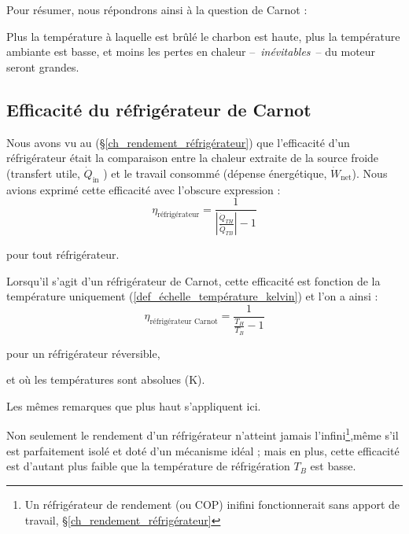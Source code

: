 		Pour résumer, nous répondrons ainsi à la question de Carnot :

		Plus la température à laquelle est brûlé le charbon est haute, plus la température ambiante est basse, et moins les pertes en chaleur --\ \emph{inévitables}\ -- du moteur seront grandes.

		 

	\subsection{Efficacité du réfrigérateur de Carnot}

		Nous avons vu au (\S\ref{ch_rendement_réfrigérateur})	que l’efficacité d’un réfrigérateur était la comparaison entre la chaleur extraite de la source froide (transfert utile, $\dot{Q}_\text{in}$ ) et le travail consommé (dépense énergétique, $\dot{W}_\text{net}$).  Nous avions exprimé cette efficacité avec l’obscure expression :
		\begin{equation}
			\eta_\text{réfrigérateur} = \frac{1}{ \left| \frac{\dot{Q}_{TH}}{\dot{Q}_{TB}} \right| - 1} \tag{6/7}
		\end{equation}

		\begin{equationterms}
			\item pour tout réfrigérateur.
		\end{equationterms}

		Lorsqu’il s’agit d’un réfrigérateur de Carnot, cette efficacité est fonction de la température uniquement (\ref{def_échelle_température_kelvin}) et l’on a ainsi :
		\begin{equation}
			\eta_\text{réfrigérateur Carnot} = \frac{1}{\frac{T_H}{T_B} - 1}
			\label{eq_efficacité_réfrigérateur_carnot_température}
		\end{equation}

		\begin{equationterms}
			\item pour un réfrigérateur réversible,
			\item et où les températures sont absolues (\si{\kelvin}).
		\end{equationterms}


		Les mêmes remarques que plus haut s’appliquent ici. 

		Non seulement le rendement d’un réfrigérateur n’atteint jamais l’infini\footnote{Un réfrigérateur de rendement (ou COP) inifini fonctionnerait sans apport de travail, \S\ref{ch_rendement_réfrigérateur}},même s’il est parfaitement isolé et doté d’un mécanisme idéal ; mais en plus, cette efficacité est d’autant plus faible que la température de réfrigération $T_B$ est basse.

